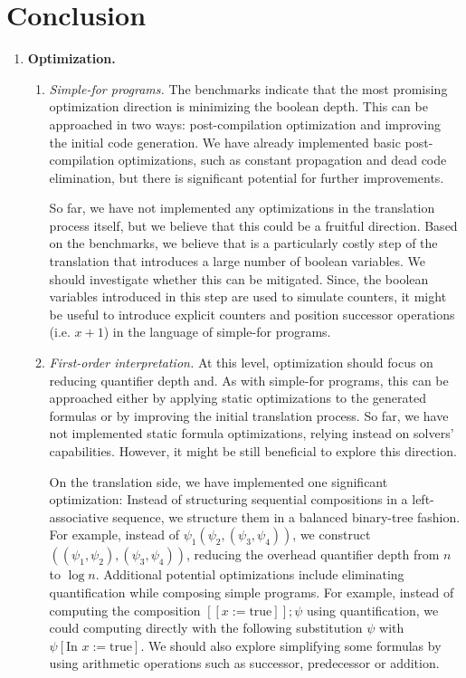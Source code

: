 \section{Conclusion}
\label{sec:conclusion}


\begin{enumerate}
    \item \textbf{Optimization.}
    \begin{enumerate}
        \item \emph{Simple-for programs.} The benchmarks indicate that the most promising optimization direction is minimizing the boolean depth.
        This can be approached in two ways: post-compilation optimization and improving the initial code generation. 
        We have already implemented basic post-compilation optimizations,
        such as constant propagation and dead code elimination,
        but there is significant potential for further improvements.
    
        So far, we have not implemented any optimizations in the translation process itself, but we believe that this could be a fruitful direction.
        Based on the benchmarks, we believe that  is a particularly costly step of the translation
        that introduces a large number of boolean variables. We should investigate whether this can be mitigated. Since, the boolean variables introduced
        in this step are used to simulate counters, it might be useful to introduce explicit counters and position successor operations (i.e. $x + 1$)
        in the language of simple-for programs.
    
        \item \emph{First-order interpretation.} At this level, optimization should focus on reducing quantifier depth and.
        As with simple-for programs, this can be approached either by applying static optimizations
        to the generated formulas or by improving the initial translation process. 
        So far, we have not implemented static formula optimizations, relying instead on solvers' capabilities.
        However, it might be still beneficial to explore this direction.
    
        On the translation side, we have implemented one significant optimization: Instead of structuring sequential compositions in a left-associative sequence,
        we structure them in a balanced binary-tree fashion. For example, instead of \(\psi_1 (\psi_2, (\psi_3, \psi_4))\),
        we construct \(((\psi_1, \psi_2), (\psi_3, \psi_4))\), reducing  the overhead quantifier depth from \(n\) to \(\log n\).
        Additional potential optimizations include eliminating quantification while composing simple programs.
        For example, instead of computing the composition \( [[x := \text{true}]]; \psi \) using quantification,
        we could computing directly with the following substitution \(\psi\) with \(\psi[\text{In } x := \text{true}]\).
        We should also explore simplifying some formulas by using arithmetic operations such as successor, predecessor or addition.
    

\end{enumerate}
\end{enumerate}
